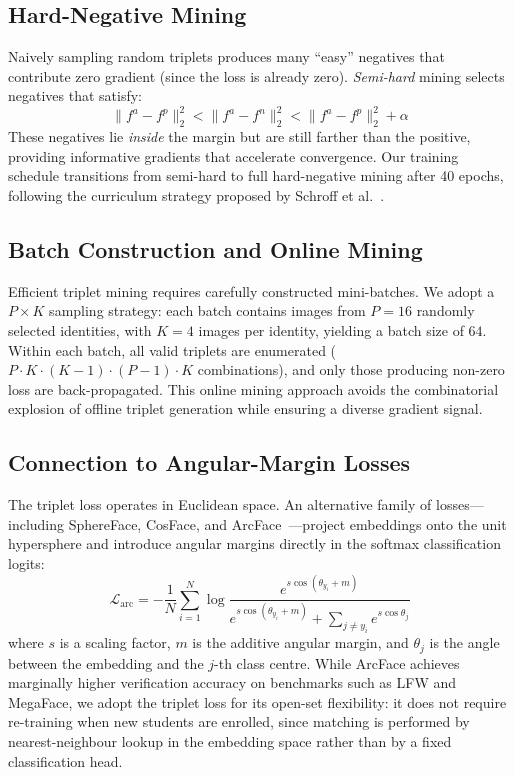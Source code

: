 \documentclass[conference, 10pt]{IEEEtran}
\begin{document}
\subsection{Hard-Negative Mining}

Naively sampling random triplets produces many ``easy'' negatives that contribute zero gradient
(since the loss is already zero).  \emph{Semi-hard} mining selects negatives that satisfy:
\begin{equation}
    \bigl\| f^a - f^p \bigr\|_2^{2}
    < \bigl\| f^a - f^n \bigr\|_2^{2}
    < \bigl\| f^a - f^p \bigr\|_2^{2} + \alpha
\end{equation}
These negatives lie \emph{inside} the margin but are still farther than the positive, providing
informative gradients that accelerate convergence.  Our training schedule transitions from
semi-hard to full hard-negative mining after 40 epochs, following the curriculum strategy
proposed by Schroff et al.~\cite{ref_facenet}.

\subsection{Batch Construction and Online Mining}

Efficient triplet mining requires carefully constructed mini-batches.  We adopt a $P \times K$
sampling strategy: each batch contains images from $P = 16$ randomly selected identities, with
$K = 4$ images per identity, yielding a batch size of $64$.  Within each batch, all valid
triplets are enumerated ($P \cdot K \cdot (K - 1) \cdot (P - 1) \cdot K$ combinations), and
only those producing non-zero loss are back-propagated.  This online mining approach avoids the
combinatorial explosion of offline triplet generation while ensuring a diverse gradient signal.

\subsection{Connection to Angular-Margin Losses}

The triplet loss operates in Euclidean space.  An alternative family of losses---including
SphereFace, CosFace, and ArcFace~\cite{ref_arcface}---project embeddings onto the unit
hypersphere and introduce angular margins directly in the softmax classification logits:
\begin{equation}
\label{eq:arcface}
    \mathcal{L}_{\text{arc}} = -\frac{1}{N} \sum_{i=1}^{N}
    \log \frac{e^{s \cos(\theta_{y_i} + m)}}{e^{s \cos(\theta_{y_i} + m)}
    + \sum_{j \neq y_i} e^{s \cos \theta_j}}
\end{equation}
where $s$ is a scaling factor, $m$ is the additive angular margin, and $\theta_j$ is the angle
between the embedding and the $j$-th class centre.  While ArcFace achieves marginally higher
verification accuracy on benchmarks such as LFW and MegaFace, we adopt the triplet loss for
its open-set flexibility: it does not require re-training when new students are enrolled, since
matching is performed by nearest-neighbour lookup in the embedding space rather than by a
fixed classification head.
\end{document}
